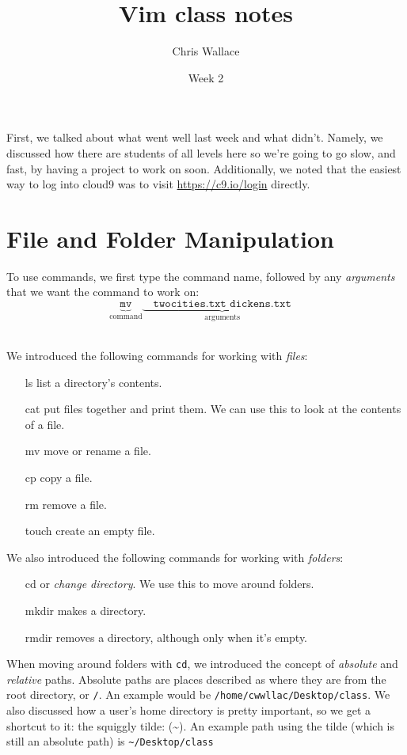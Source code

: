 \documentclass{article}
\title{Vim class notes}
\author{Chris Wallace}
\date{Week 2}
\begin{document}
\maketitle

First, we talked about what went well last week and what didn't. Namely, we
discussed how there are students of all levels here so we're going to go slow,
and fast, by having a project to work on soon. Additionally, we noted that the
easiest way to log into cloud9 was to visit \url{https://c9.io/login} directly.

\section*{File and Folder Manipulation}
To use commands, we first type the command name, followed by any
\textit{arguments} that we want the command to work on:
	\[
        \hspace {0em} \underbrace{\texttt{mv}}_{\text{command}}
        \underbrace{
        \hspace {1em}
            \texttt{twocities.txt dickens.txt}
        \hspace {1em}
        }_{\text{arguments}}
	\]

~\\
\noindent
We introduced the following commands for working with \textit{files}:
\begin{itemize}
    \item[ls] list a directory's contents.
    \item[cat] put files together and print them. We can use this to look at the
        contents of a file.
    \item[mv] move or rename a file.
    \item[cp] copy a file.
    \item[rm] remove a file.
    \item[touch] create an empty file.
\end{itemize}

\noindent
We also introduced the following commands for working with \textit{folders}:
\begin{itemize}
    \item[cd] or \textit{change directory}. We use this to move around folders.
    \item[mkdir] makes a directory.
    \item[rmdir] removes a directory, although only when it's empty.
\end{itemize}

When moving around folders with \texttt{cd}, we introduced the concept of
\textit{absolute} and \textit{relative} paths. Absolute paths are places
described as where they are from the root directory, or \texttt{/}. An example
would be \texttt{/home/cwwllac/Desktop/class}. We also discussed how a user's
home directory is pretty important, so we get a shortcut to it: the squiggly
tilde: (\textasciitilde{}). An example path using the tilde (which is still an
absolute path) is \texttt{\textasciitilde{}/Desktop/class}
\end{document}
